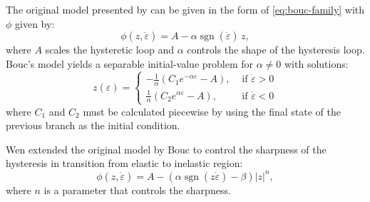 \begin{description}
\tightlist
\item[Bouc's Hysteresis (1967)]
The original model presented by \cite{bouc1967forced} can be given in the form of \eqref{eq:bouc-family} with \(\phi\) given by: 
\begin{equation}
\phi(z,\dot{\varepsilon})=A-\alpha \operatorname{sgn}(\dot{\varepsilon}) \, z,
\label{eq:bouc-family1}
\end{equation}
where $A$ scales the hysteretic loop and  $\alpha$ controls the 
shape of the hysteresis loop.
Bouc's model yields a separable initial-value problem for \(\alpha \ne 0\) with solutions:
\begin{equation}
  z(\varepsilon) = \begin{cases}-\frac{1}{\alpha}\left(C_1 e^{-\alpha \varepsilon}-A\right), & \text { if } \dot{\varepsilon}>0 \\ \frac{1}{\alpha}\left(C_2 e^{\alpha \varepsilon}-A\right), & \text { if } \dot{\varepsilon}<0\end{cases}
\label{eq:bouc-family2}
\end{equation}
where \(C_1\) and \(C_2\) must be calculated piecewise by using the
final state of the previous branch as the initial condition.

\item[Wen's Hysteresis (1976)]
Wen \cite{wen1976method} extended the original model by Bouc to control the sharpness of the hysteresis in transition from elastic to inelastic region:
\begin{equation}
\phi(z,\dot{\varepsilon}) = A-\left(\alpha \operatorname{sgn}(z \dot{\varepsilon})-\beta\right)|z|^{n},
\label{eq:bouc-family3}
\end{equation}
where $n$ is a parameter that controls the sharpness.


\end{description}
